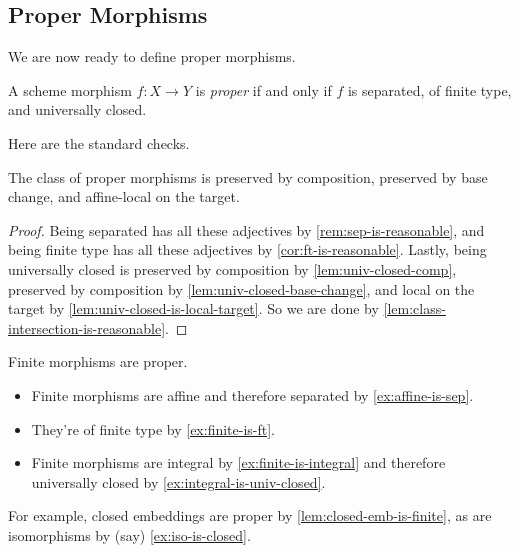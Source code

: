 \documentclass[../notes.tex]{subfiles}
\begin{document}
\subsection{Proper Morphisms}
We are now ready to define proper morphisms.
\begin{definition}[Proper]
	A scheme morphism $f\colon X\to Y$ is \textit{proper} if and only if $f$ is separated, of finite type, and universally closed.
\end{definition}
Here are the standard checks.
\begin{lemma} \label{lem:proper-is-reasonable}
	The class of proper morphisms is preserved by composition, preserved by base change, and affine-local on the target.
\end{lemma}
\begin{proof}
	Being separated has all these adjectives by \autoref{rem:sep-is-reasonable}, and being finite type has all these adjectives by \autoref{cor:ft-is-reasonable}. Lastly, being universally closed is preserved by composition by \autoref{lem:univ-closed-comp}, preserved by composition by \autoref{lem:univ-closed-base-change}, and local on the target by \autoref{lem:univ-closed-is-local-target}. So we are done by \autoref{lem:class-intersection-is-reasonable}.
\end{proof}
\begin{example} \label{ex:finite-is-proper}
	Finite morphisms are proper.
	\begin{itemize}
		\item Finite morphisms are affine and therefore separated by \autoref{ex:affine-is-sep}.
		\item They're of finite type by \autoref{ex:finite-is-ft}.
		\item Finite morphisms are integral by \autoref{ex:finite-is-integral} and therefore universally closed by \autoref{ex:integral-is-univ-closed}.
	\end{itemize}
	For example, closed embeddings are proper by \autoref{lem:closed-emb-is-finite}, as are isomorphisms by (say) \autoref{ex:iso-is-closed}.
\end{example}
\end{document}
